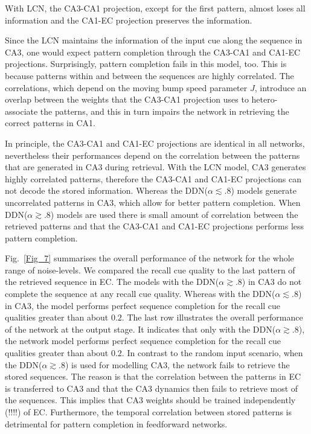 \documentclass[utf8]{frontiersSCNS} %
\begin{document}
With LCN, the CA3-CA1 projection, except for the first pattern, almost loses all information and the CA1-EC projection preserves the information.

Since the LCN maintains the information of the input cue along the sequence in CA3, one would expect pattern completion through the CA3-CA1 and CA1-EC projections. Surprisingly, pattern completion fails in this model, too. This is because patterns within and between the sequences are highly correlated. The correlations, which depend on the moving bump speed parameter $J$, introduce an overlap between the weights that the CA3-CA1 projection uses to hetero-associate the patterns, and this in turn impairs the network in retrieving the correct patterns in CA1.

%
In principle, the CA3-CA1 and CA1-EC projections are identical in all networks, nevertheless their performances depend on the correlation between the patterns that are generated in CA3 during retrieval. With the LCN model, CA3 generates highly correlated patterns, therefore the CA3-CA1 and CA1-EC projections can not decode the stored information. Whereas the DDN($\alpha \lesssim .8$) models generate uncorrelated patterns in CA3, which allow for better pattern completion. When DDN($\alpha \gtrsim .8$) models are used there is small amount of correlation between the retrieved patterns and that the CA3-CA1 and CA1-EC projections performs less pattern completion.



%
Fig.~\ref{Fig_7} summarises the overall performance of the network for the whole range of noise-levels. We compared the recall cue quality to the last pattern of the retrieved sequence in EC. The models with the DDN($\alpha \gtrsim .8$) in CA3 do not complete the sequence at any recall cue quality. Whereas with the DDN($\alpha \lesssim .8$) in CA3, the model performs perfect sequence completion for the recall cue qualities greater than about $0.2$.
%
The last row illustrates the overall performance of the network at the output stage. It indicates that only with the DDN($\alpha \gtrsim .8$), the network model performs perfect sequence completion for the recall cue qualities greater than about $0.2$. In contrast to the random input scenario, when the DDN($\alpha \gtrsim .8$) is used for modelling CA3, the network fails to retrieve the stored sequences. The reason is that the correlation between the patterns in EC is transferred to CA3 and that the CA3 dynamics then fails to retrieve most of the sequences. This implies that CA3 weights should be trained independently (!!!!) of EC. Furthermore, the temporal correlation between stored patterns is detrimental for pattern completion in feedforward networks. 
\end{document}

